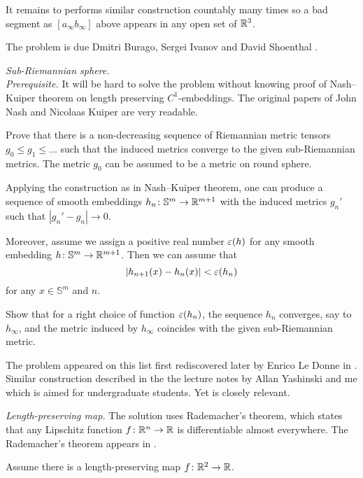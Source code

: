 It remains to performs similar construction countably many times so a bad segment as $[a_\infty b_\infty]$ above
appears in any open set of $\mathbb{R}^3$.


The problem is due
Dmitri Burago, 
Sergei Ivanov 
and David Shoenthal \cite[see][]{BIS}.

\textit{Sub-Riemannian sphere.}\\
\textit{Prerequisite.}
It will be hard to solve the problem without knowing proof of Nash--Kuiper theorem on length preserving $C^1$-embeddings.
The original papers of John Nash 
and Nicolaas Kuiper \cite[see][]{nash,kuiper} are very readable.

Prove that there is a non-decreasing sequence of Riemannian metric tensors
$g_0\le g_1\le ...$ such that the induced metrics converge to the given sub-Riemannian metrics.
The metric $g_0$ can be assumed to be a metric on round sphere.

Applying the construction as in Nash--Kuiper theorem,
one can produce a sequence of smooth embeddings $h_n\colon\mathbb{S}^m\to \mathbb{R}^{m+1}$ with the induced metrics $g_n'$
such that $|g_n'-g_n|\to 0$.

Moreover, assume we assign a positive real number $\varepsilon(h)$ for any smooth embedding $h\colon\mathbb{S}^m\to\mathbb{R}^{m+1}$.
Then we can assume that 
\[|h_{n+1}(x)-h_n(x)|<\varepsilon(h_n)\] for any $x\in \mathbb{S}^m$ and $n$.

Show that for a right choice of function $\varepsilon(h_n)$,
the sequence $h_n$ converges, say to $h_\infty$, 
and the metric induced by $h_\infty$ coincides with the given sub-Riemannian metric.

The problem appeared 
on this list first rediscovered later by Enrico Le Donne in \cite{le-donne}.
Similar construction described in the the lecture notes by Allan Yashinski and me \cite[see][]{petrunin-yashinsky} 
which is aimed for undergraduate students. 
Yet \cite{petrunin-paths} is closely relevant.

\textit{Length-preserving map.}
The solution uses Rademacher's theorem,
which states that any Lipschitz function $f\colon\mathbb{R}^n\to\mathbb{R}$ 
is differentiable almost everywhere.
The Rademacher's theorem appears in \cite{rademacher}. 

Assume there is a length-preserving map $f\colon\mathbb{R}^2\to \mathbb{R}$.

